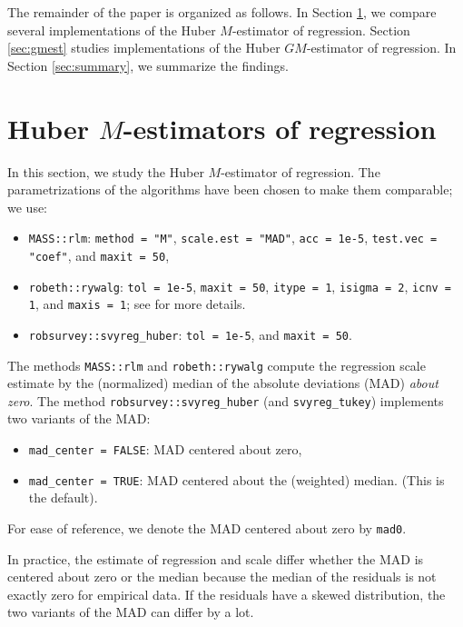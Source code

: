\documentclass[a4paper,oneside,11pt,DIV=12]{scrartcl}
\newcommand{\code}[1]{{\texttt{#1}}}
\begin{document}
The remainder of the paper is organized as follows. In Section
\ref{sec:mest}, we compare several implementations of the Huber
$M$-estimator of regression. Section \ref{sec:gmest} studies
implementations of the Huber $GM$-estimator of regression. In
Section \ref{sec:summary}, we summarize the findings.

\section{Huber $M$-estimators of regression}\label{sec:mest}
In this section, we study the Huber $M$-estimator of regression. The
parametrizations of the algorithms have been chosen to make them
comparable; we use:
\begin{itemize}
    \item \code{MASS::rlm}: \code{method = "M"},
        \code{scale.est = "MAD"}, \code{acc = 1e-5},
        \code{test.vec = "coef"}, and \code{maxit = 50},
    \item \code{robeth::rywalg}: \code{tol = 1e-5}, \code{maxit = 50},
        \code{itype = 1}, \code{isigma = 2}, \code{icnv = 1},
        and \code{maxis = 1}; see \cite{marazzi1993} for more details.
    \item \code{robsurvey::svyreg\_huber}: \code{tol = 1e-5},
        and \code{maxit = 50}.
\end{itemize}

\noindent The methods \code{MASS::rlm} and \code{robeth::rywalg} compute
the regression scale estimate by the (normalized) median of the absolute
deviations (MAD) \emph{about zero}. The method \code{robsurvey::svyreg\_huber}
(and \code{svyreg\_tukey}) implements two variants of the MAD:
\begin{itemize}
    \item \code{mad\_center = FALSE}: MAD centered about zero,
    \item \code{mad\_center = TRUE}: MAD centered about the (weighted) median.
    (This is the default).
\end{itemize}

\noindent For ease of reference, we denote the MAD centered about zero by
\code{mad0}.

In practice, the estimate of regression and scale differ
whether the MAD is centered about zero or the median because the median
of the residuals is not exactly zero for empirical data. If the residuals
have a skewed distribution, the two variants of the MAD can differ by a lot.
\end{document}
